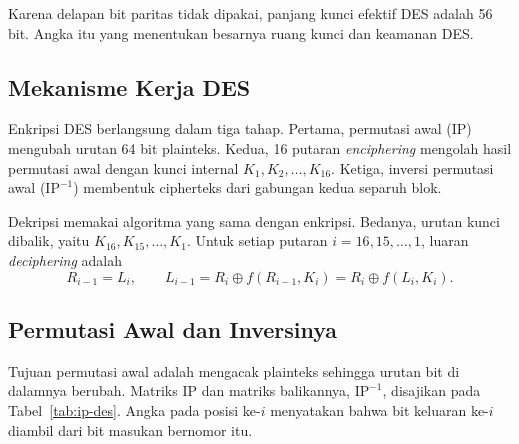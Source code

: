 Karena delapan bit paritas tidak dipakai, panjang kunci efektif DES adalah
56 bit. Angka itu yang menentukan besarnya ruang kunci dan keamanan DES.

\subsection{Mekanisme Kerja DES}

Enkripsi DES berlangsung dalam tiga tahap. Pertama, permutasi awal (IP)
mengubah urutan 64 bit plainteks. Kedua, 16 putaran \textit{enciphering}
mengolah hasil permutasi awal dengan kunci internal $K_1, K_2, \dots, K_{16}$.
Ketiga, inversi permutasi awal ($\text{IP}^{-1}$) membentuk cipherteks dari
gabungan kedua separuh blok.

Dekripsi memakai algoritma yang sama dengan enkripsi. Bedanya, urutan kunci
dibalik, yaitu $K_{16}, K_{15}, \dots, K_1$. Untuk setiap putaran
$i = 16, 15, \dots, 1$, luaran \textit{deciphering} adalah
\begin{equation}
R_{i-1} = L_i, \qquad
L_{i-1} = R_i \oplus f(R_{i-1}, K_i) = R_i \oplus f(L_i, K_i).
\end{equation}

\subsection{Permutasi Awal dan Inversinya}

Tujuan permutasi awal adalah mengacak plainteks sehingga urutan bit di
dalamnya berubah. Matriks IP dan matriks balikannya, $\text{IP}^{-1}$,
disajikan pada Tabel~\ref{tab:ip-des}. Angka pada posisi ke-$i$ menyatakan
bahwa bit keluaran ke-$i$ diambil dari bit masukan bernomor itu.

